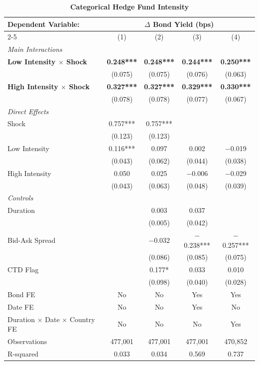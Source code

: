 \documentclass[english, 11pt, oneside]{article}
\begin{document}
\begin{table}[h!]
\centering
\caption{\textbf{Categorical Hedge Fund Intensity}}
\footnotesize
\setlength{\tabcolsep}{10pt}
\renewcommand{\arraystretch}{1.1}
\begin{tabular}{l c c c c}
\toprule
\textbf{Dependent Variable:} & \multicolumn{4}{c}{\textbf{$\Delta$ Bond Yield (bps)}} \\
\cmidrule(lr){2-5}
 & (1) & (2) & (3) & (4) \\
\midrule
\textit{Main Interactions} & & & & \\
\textbf{Low Intensity $\times$ Shock} & \textbf{0.248***} & \textbf{0.248***} & \textbf{0.244***} & \textbf{0.250***} \\
 & (0.075) & (0.075) & (0.076) & (0.063) \\
\textbf{High Intensity $\times$ Shock} & \textbf{0.327***} & \textbf{0.327***} & \textbf{0.329***} & \textbf{0.330***} \\
 & (0.078) & (0.078) & (0.077) & (0.067) \\
\addlinespace
\textit{Direct Effects} & & & & \\
Shock & 0.757*** & 0.757*** &  &  \\
 & (0.123) & (0.123) &  &  \\
Low Intensity & 0.116*** & 0.097 & 0.002 & $-$0.019 \\
 & (0.043) & (0.062) & (0.044) & (0.038) \\
High Intensity & 0.050 & 0.025 & $-$0.006 & $-$0.029 \\
 & (0.043) & (0.063) & (0.048) & (0.039) \\
\addlinespace
\textit{Controls} & & & & \\
Duration & & 0.003 & 0.037 &  \\
 & & (0.005) & (0.042) &  \\
Bid-Ask Spread & & $-$0.032 & $-$0.238*** & $-$0.257*** \\
 & & (0.086) & (0.085) & (0.075) \\
CTD Flag & & 0.177* & 0.033 & 0.010 \\
 & & (0.098) & (0.040) & (0.028) \\
\midrule
Bond FE & No & No & Yes & Yes \\
Date FE & No & No & Yes & No \\
Duration $\times$ Date $\times$ Country FE & No & No & No & Yes \\
\midrule
Observations & 477,001 & 477,001 & 477,001 & 470,852 \\
R-squared & 0.033 & 0.034 & 0.569 & 0.737 \\
\bottomrule
\end{tabular}
\label{tab:categorical}


\end{table}
\end{document}
